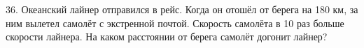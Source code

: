36. Океанский лайнер отправился в рейс. Когда он отошёл от берега на 180 км, за ним вылетел самолёт с экстренной почтой. Скорость самолёта в 10 раз больше скорости лайнера. На каком расстоянии от берега самолёт догонит лайнер?\\
